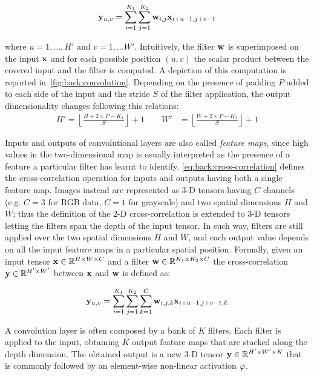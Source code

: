\begin{equation}\label{eq:back:cross-correlation}
    \mathbf{y}_{u,v} = \sum_{i=1}^{K_1} \sum_{j=1}^{K_2} \mathbf{w}_{i,j} \mathbf{x}_{i+u-1,j+v-1}
\end{equation}

where $u = 1, \dots, H'$ and $v = 1, \dots W'$.
Intuitively, the filter $\mathbf{w}$ is superimposed on the input $\mathbf{x}$ and for each possible position $(u,v)$ the scalar product between the covered input and the filter is computed.
A depiction of this computation is reported in~\ref{fig:back:convolution}.
Depending on the presence of padding $P$ added to each side of the input and the stride $S$ of the filter application, the output dimensionality changes following this relations:
\begin{align*}
    H' = \left \lfloor \frac{H + 2 \times P - K_1}{S} \right \rfloor + 1 \qquad
    W' &= \left \lfloor \frac{W + 2 \times P - K_2}{S} \right \rfloor + 1
\end{align*}

Inputs and outputs of convolutional layers are also called \emph{feature maps}, since high values in the two-dimensional map is usually interpreted as the presence of a feature a particular filter has learnt to identify.
\ref{eq:back:cross-correlation} defines the cross-correlation operation for inputs and outputs having both a single feature map.
Images instead are represented as 3-D tensors having $C$ channels (e.g. $C=3$ for RGB data, $C=1$ for grayscale) and two spatial dimensions $H$ and $W$;
thus the definition of the 2-D cross-correlation is extended to 3-D tensors letting the filters span the depth of the input tensor.
In such way, filters are still applied over the two spatial dimensions $H$ and $W$, and each output value depends on all the input feature maps in a particular spatial position.
Formally, given an input tensor $\mathbf{x} \in \mathbb{R}^{H \times W \times C}$ and a filter $\mathbf{w} \in \mathbb{R}^{K_1 \times K_2 \times C}$ the cross-correlation $\mathbf{y} \in \mathbb{R}^{H' \times W'}$ between $\mathbf{x}$ and $\mathbf{w}$ is defined as:

\begin{equation}\label{eq:back:channel-cross-correlation}
    \mathbf{y}_{u,v} = \sum_{i=1}^{K_1} \sum_{j=1}^{K_2} \sum_{k=1}^C \mathbf{w}_{i,j,k} \mathbf{x}_{i+u-1,j+v-1,k}
\end{equation}

A convolution layer is often composed by a bank of $K$ filters.
Each filter is applied to the input, obtaining $K$ output feature maps that are stacked along the depth dimension.
The obtained output is a new 3-D tensor $\mathbf{y} \in \mathbb{R}^{H' \times W' \times K}$ that is commonly followed by an element-wise non-linear activation $\varphi$.

